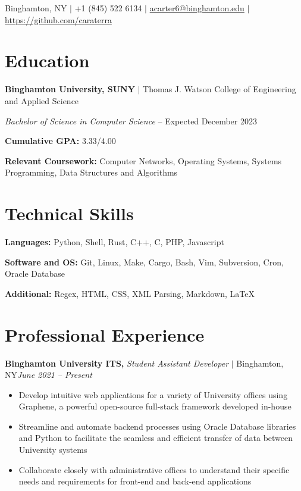 \documentclass[8pt]{extarticle}
\author{Alexander Carter}
\newcommand{\jobentry}[4]{\textbf{#1,} \textit{#2} \(|\) #3\hfill \textit{#4}}
\renewcommand{\maketitle}{\begin{center}\Huge\theauthor\end{center}\vspace{.5em}}
\begin{document}
\maketitle

\begin{center}
  Binghamton, NY
  \(|\)
  +1 (845) 522 6134
  \(|\)
  \href{mailto://acarter6@binghamton.edu}{acarter6@binghamton.edu}
  \(|\)
  \href{https://github.com/caraterra}{https://github.com/caraterra}
\end{center}

\section{Education}

\textbf{Binghamton University, SUNY} \(|\) Thomas J. Watson College of Engineering and Applied Science

\textit{Bachelor of Science in Computer Science} -- Expected December 2023

\textbf{Cumulative GPA:} 3.33/4.00

\textbf{Relevant Coursework:} Computer Networks, Operating Systems, Systems Programming, Data Structures and Algorithms

\section{Technical Skills}

\textbf{Languages:} Python, Shell, Rust, C++, C, PHP, Javascript

\textbf{Software and OS:} Git, Linux, Make, Cargo, Bash, Vim, Subversion, Cron, Oracle Database

\textbf{Additional:} Regex, HTML, CSS, XML Parsing, Markdown, {\LaTeX}

\section{Professional Experience}

\jobentry{Binghamton University ITS}{Student Assistant Developer}{Binghamton, NY}{June 2021 -- Present}

\begin{itemize}
  \item{Develop intuitive web applications for a variety of University offices using Graphene, a powerful open-source full-stack framework developed in-house}
  \item{Streamline and automate backend processes using Oracle Database libraries and Python to facilitate the seamless and efficient transfer of data between University systems}
  \item{Collaborate closely with administrative offices to understand their specific needs and requirements for front-end and back-end applications}
\end{itemize}
\end{document}
